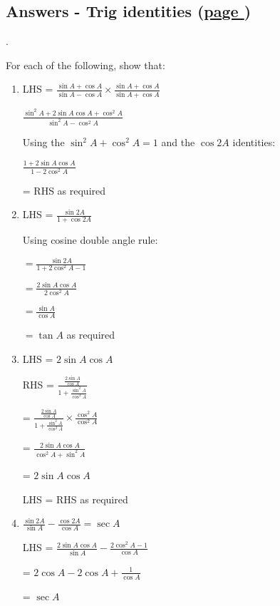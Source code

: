 \documentclass[../main.tex]{subfiles}
\begin{document}
\hypertarget{trigidentitiesanswers}{\subsection*{Answers - Trig identities (\hyperlink{trigidentitieslink}{page \pageref{Trig identities}})}}

\label{Trig identities answers}.

For each of the following, show that:
\begin{enumerate}
    \item LHS = $\frac{\sin{A}+\cos{A}}{\sin{A}-\cos{A}}\times \frac{\sin{A}+\cos{A}}{\sin{A}+\cos{A}}$

    $\frac{\sin^2{A}+2\sin{A}\cos{A}+\cos^2{A}}{\sin^2{A}-\cos^2{A}}$

    Using the $\sin^2{A}+\cos^2{A}=1$ and the $\cos{2A}$ identities:

    $\frac{1+2\sin{A}\cos{A}}{1-2\cos^2{A}}$
    
    = RHS as required

    \item LHS = $\frac{\sin{2A}}{1+\cos{2A}}$

    Using cosine double angle rule:

    $ = \frac{\sin{2A}}{1+2\cos^2{A}-1}$

    $ = \frac{2\sin{A}\cos{A}}{2\cos^2{A}}$

    $ = \frac{\sin{A}}{\cos{A}}$

    $ = \tan{A}$ as required

    
    \item LHS = $2\sin{A}\cos{A}$

    RHS = $\frac{\frac{2\sin{A}}{\cos{A}}}{1+\frac{\sin^2{A}}{\cos^2{A}}}$

    = $\frac{\frac{2\sin{A}}{\cos{A}}}{1+\frac{\sin^2{A}}{\cos^2{A}}}\times \frac{\cos^2{A}}{\cos^2{A}}$

    = $\frac{2\sin{A}\cos{A}}{\cos^2{A}+\sin^2{A}}$

    = $2\sin{A}\cos{A}$
    
    LHS = RHS as required

    \item $\frac{\sin{2A}}{\sin{A}}-\frac{\cos{2A}}{\cos{A}}=\sec{A}$
    
    LHS = $\frac{2\sin{A}\cos{A}}{\sin{A}}-\frac{2\cos^2{A}-1}{\cos{A}}$

    = $2\cos{A}-2\cos{A}+\frac{1}{\cos{A}}$

    = $\sec{A}$
    

\end{enumerate}
\end{document}
